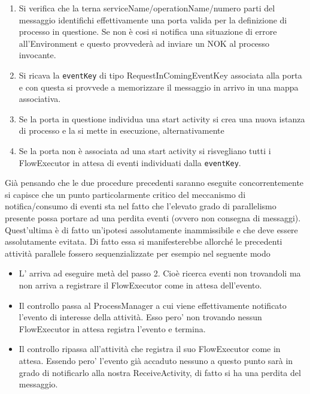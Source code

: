 \begin{enumerate}
  \item Si verifica che la terna serviceName/operationName/numero parti del
  messaggio identifichi effettivamente una porta valida per la definizione 
  di processo in questione. Se non \`e cosi si notifica una
  situazione di errore all'Environment e questo provvederà ad inviare un NOK al
  processo invocante.
 
 \item Si ricava la \texttt{eventKey} di tipo RequestInComingEventKey associata
 alla porta e con questa si provvede a memorizzare il messaggio in arrivo in una mappa associativa.
 
 \item Se la porta in questione individua una start activity si crea una nuova
 istanza di processo e la si mette in esecuzione, alternativamente 
 
 \item Se la porta non \`e associata ad una start activity si risvegliano tutti
 i FlowExecutor in attesa di eventi individuati dalla \texttt{eventKey}.
\end{enumerate}

Già pensando che le due procedure precedenti saranno eseguite concorrentemente
si capisce che un punto particolarmente critico del meccanismo di
notifica/consumo di eventi sta nel fatto che l'elevato grado di parallelismo
presente possa portare ad una perdita eventi (ovvero non consegna di messaggi).
Quest'ultima \`e di fatto un'ipotesi assolutamente inammissibile e che deve
essere assolutamente evitata. Di fatto essa si manifesterebbe allorché le precedenti
attività parallele fossero sequenzializzate per esempio nel seguente modo

\begin{itemize}
  \item L' arriva ad eseguire metà del passo 2. Cioè
  ricerca eventi non trovandoli ma non arriva a registrare il FlowExecutor come
  in attesa dell'evento.
  \item Il controllo passa al ProcessManager a cui viene effettivamente
  notificato l'evento di interesse della attività. Esso pero' non trovando
  nessun FlowExecutor in attesa registra l'evento e termina.
  \item Il controllo ripassa all'attività che registra il suo FlowExecutor come
  in attesa. Essendo pero' l'evento già accaduto nessuno a questo punto sarà
  in grado di notificarlo alla nostra ReceiveActivity, di fatto si ha una
  perdita del messaggio.
\end{itemize}


